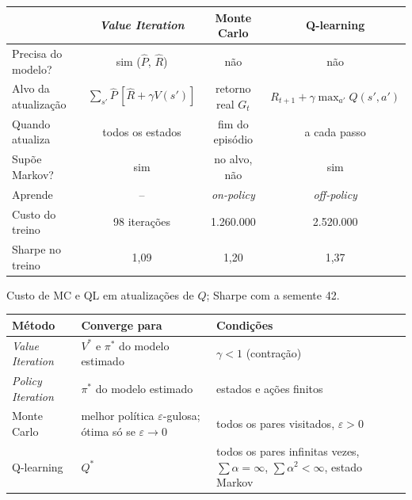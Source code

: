 \documentclass[11pt,a4paper]{article}
\begin{document}
\begin{center}
\small
\begin{tabular}{l ccc}
  \toprule
  & \textbf{\textit{Value Iteration}} & \textbf{Monte Carlo} & \textbf{Q-learning} \\
  \midrule
  Precisa do modelo?   & sim ($\widehat{P}$, $\widehat{R}$) & não                & não \\
  Alvo da atualização  & $\sum_{s'} \widehat{P}\,[\widehat{R} + \gamma V(s')]$ & retorno real $G_t$ & $R_{t+1} + \gamma \max_{a'} Q(s',a')$ \\
  Quando atualiza      & todos os estados                   & fim do episódio     & a cada passo \\
  Supõe Markov?        & sim                                & no alvo, não        & sim \\
  Aprende              & --                                 & \textit{on-policy}  & \textit{off-policy} \\
  \midrule
  Custo do treino      & 98 iterações                       & 1.260.000           & 2.520.000 \\
  Sharpe no treino     & 1,09                               & 1,20                & 1,37 \\
  \bottomrule
\end{tabular}

\smallskip
{\footnotesize Custo de MC e QL em atualizações de $Q$; Sharpe com a semente 42.}
\end{center}

\begin{center}
\small
\begin{tabular}{L{2.4cm} L{4.2cm} L{7.6cm}}
  \toprule
  \textbf{Método} & \textbf{Converge para} & \textbf{Condições} \\
  \midrule
  \textit{Value Iteration}  & $V^*$ e $\pi^*$ do modelo estimado & $\gamma < 1$ (contração) \\
  \textit{Policy Iteration} & $\pi^*$ do modelo estimado & estados e ações finitos \\
  Monte Carlo               & melhor política $\varepsilon$-gulosa; ótima só se $\varepsilon \to 0$ & todos os pares visitados, $\varepsilon > 0$ \\
  Q-learning                & $Q^*$ & todos os pares infinitas vezes, $\sum \alpha = \infty$, $\sum \alpha^2 < \infty$, estado Markov \\
  \bottomrule
\end{tabular}
\end{center}
\end{document}
